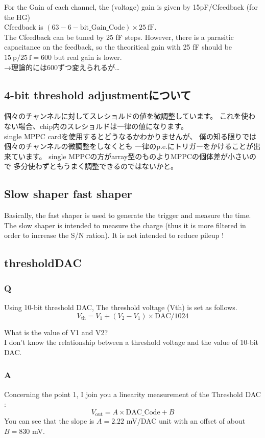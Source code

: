 For the Gain of each channel, the (voltage) gain is given by 15pF/Cfeedback (for the HG)\\
Cfeedback is $(63 - 6-\mathrm{bit\_Gain\_Code}) \times 25\ \mathrm{fF}$.\\
The Cfeedback can be tuned by 25 fF steps. However, there is a parasitic capacitance on the feedback, so the theoritical gain with 25 fF should be $15\ \mathrm{p} / 25\ \mathrm{f} = 600$ but real gain is lower. \\
→理論的には600ずつ変えられるが…


\subsection{4-bit threshold adjustmentについて}

個々のチャンネルに対してスレショルドの値を微調整しています。
これを使わない場合、chip内のスレショルドは一律の値になります。\\
single MPPC cardを使用するとどうなるかわかりませんが、
僕の知る限りでは個々のチャンネルの微調整をしなくとも
一律のp.e.にトリガーをかけることが出来ています。
single MPPCの方がarray型のものよりMPPCの個体差が小さいので
多分使わずともうまく調整できるのではないかと。

\subsection{Slow shaper fast shaper}

Basically, the fast shaper is used to generate the trigger and measure the time.\\
The slow shaper is intended to measure the charge (thus it is more filtered in order to increase the S/N ration). It is not intended to reduce pileup !


\subsection{thresholdDAC}
\subsubsection*{Q} 
Using 10-bit threshold DAC, The threshold voltage (Vth) is set as follows.
\[ V_{\mathrm{th}} = V_1 + (V_2 - V_1) \times \mathrm{DAC} /1024 \]

What is the value of V1 and V2?\\
I don't know the relationship between a threshold voltage and the value of 10-bit DAC.\\

\subsubsection*{A} 
Concerning the point 1, I join you a linearity measurement of the Threshold DAC :
\[ V_{\mathrm{out}} = A \times \mathrm{DAC\_Code} + B \]
You can see that the slope is $A = 2.22$ mV/DAC unit with an offset of about $B = 830$ mV.

